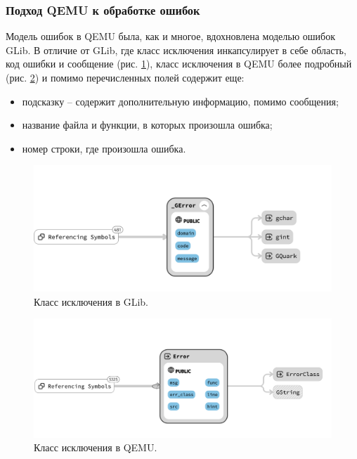 \subsubsection{Подход QEMU к обработке ошибок}\label{sec:ch2/sec1/sub5/sub1}

Модель ошибок в QEMU была, как и многое, вдохновлена моделью ошибок GLib.
В отличие от GLib, где класс исключения инкапсулирует в себе область, код ошибки и сообщение (рис. \ref{fig:glib-error}),
класс исключения в QEMU более подробный (рис. \ref{fig:qemu-error}) и помимо перечисленных полей содержит еще:
\begin{itemize}
    \item подсказку -- содержит дополнительную информацию, помимо сообщения;
    \item название файла и функции, в которых произошла ошибка;
    \item номер строки, где произошла ошибка.
\end{itemize}

\begin{figure}[!htbp]
    \centering
    \begin{adjustbox}{max totalsize={\textwidth}{\textheight}}
        \includegraphics[]{images/glib-error.png}
    \end{adjustbox}
    \caption{Класс исключения в GLib.}\label{fig:glib-error}
\end{figure}

\begin{figure}[!htbp]
    \centering
    \begin{adjustbox}{max totalsize={\textwidth}{\textheight}}
        \includegraphics[]{images/qemu-error.png}
    \end{adjustbox}
    \caption{Класс исключения в QEMU.}\label{fig:qemu-error}
\end{figure}

